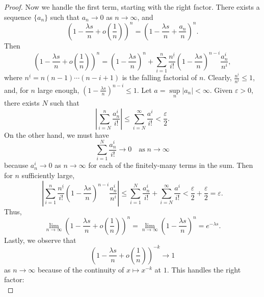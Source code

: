 \documentclass{homework}
\begin{document}
\begin{proof}
		Now we handle the first term, starting with the right factor. There exists a sequence $\{a_n\}$ such that $a_n \to 0$ as $n \to \infty$, and
		\begin{equation*}
			\left(1 - \frac{\lambda s}{n} + o\left(\frac{1}{n}\right)\right)^n =\left(1 - \frac{\lambda s}{n} + \frac{a_n}{n}\right)^n.
		\end{equation*}
		Then
		\begin{equation*}
			\left(1 - \frac{\lambda s}{n} + o\left(\frac{1}{n}\right)\right)^n = \left(1 - \frac{\lambda s}{n}\right)^n + \sum_{i=1}^n \frac{n^{\underline{i}}}{i!}\left(1- \frac{\lambda s}{n}\right)^{n-i}\frac{a_n^i}{n^i},
		\end{equation*}
		where $n^{\underline{i}} = n(n-1)\cdots (n-i+1)$ is the falling factorial of $n$. Clearly, $\frac{n^{\underline{i}}}{n^i} \le 1$, and, for $n$ large enough, $\left(1-\frac{\lambda s}{n}\right)^{n-i} \le 1$. Let $a = \sup\limits_n |a_n| < \infty$. Given $\varepsilon > 0$, there exists $N$ such that
		\begin{equation*}
			\left|\sum_{i=N}^n \frac{a_n^i}{i!}\right| \le \sum_{i=N}^\infty \frac{a^i}{i!} < \frac{\varepsilon}{2}.
		\end{equation*}
		On the other hand, we must have
		\begin{equation*}
			\sum_{i=1}^N\frac{a_n^i}{i!} \to 0 \quad\text{as}\;n\to\infty
		\end{equation*}
		because $a_n^i \to 0$ as $n \to \infty$ for each of the finitely-many terms in the sum. Then for $n$ sufficiently large,
		\begin{equation*}
			\left|\sum_{i=1}^n\frac{n^{\underline{i}}}{i!}\left(1-\frac{\lambda s}{n}\right)^{n-i}\frac{a_n^i}{n^i}\right| \le \sum_{i=1}^N \frac{a_n^i}{i!} + \sum_{i=N}^\infty \frac{a^i}{i!} < \frac{\varepsilon}{2} + \frac{\varepsilon}{2} = \varepsilon.
		\end{equation*}
		Thus,
		\begin{equation*}
			\lim_{n\to \infty}\left(1 - \frac{\lambda s}{n} + o\left(\frac{1}{n}\right)\right)^n = \lim_{n\to\infty}\left(1-\frac{\lambda s}{n}\right)^n = e^{-\lambda s}.
		\end{equation*}
		Lastly, we observe that
		\begin{equation*}
			\left(1-\frac{\lambda s}{n} + o\left(\frac{1}{n}\right)\right)^{-k} \to 1
		\end{equation*}
		as $n \to \infty$ because of the continuity of $x \mapsto x^{-k}$ at $1$. This handles the right factor:
		\begin{equation*}

\end{equation*}
\end{proof}
\end{document}
